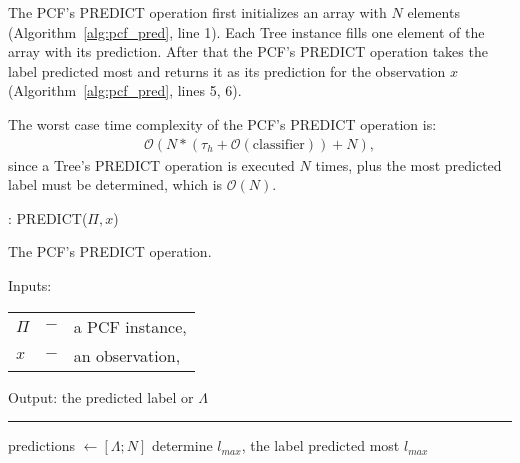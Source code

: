 The PCF's PREDICT operation first initializes an array with
$N$ elements (Algorithm~\ref{alg:pcf_pred}, line 1). Each
Tree instance fills one element of the array with its
prediction. After that the PCF's PREDICT operation takes
the label predicted most and returns it as its prediction
for the observation $x$ (Algorithm~\ref{alg:pcf_pred},
lines 5, 6).

The worst case time complexity of the PCF's PREDICT
operation is:
\begin{align}
  \mathcal{O}(N * (\tau_h + \mathcal{O} (\text{classifier})) + N),
\end{align}
since a Tree's PREDICT operation
is executed $N$ times, plus the most predicted label
must be determined, which is $\mathcal{O}(N)$.

\begin{algorithm}
  \caption{: PREDICT($\Pi, x$)}
  \label{alg:pcf_pred}
  The PCF's PREDICT operation.

  Inputs:

    \begin{tabu}{llX}
    $\Pi$ &$-$ &a PCF instance,\\
    $x$ &$-$ &an observation, \\
    \end{tabu}

  Output: the predicted label or $\Lambda$

  \noindent\rule{\linewidth}{0.4pt}

  \begin{algorithmic}[1]
    \STATE predictions $\leftarrow [\Lambda; N]$
    \ENDFOR
    \STATE determine $l_{max}$, the label predicted most
    \RETURN $l_{max}$
  \end{algorithmic}
\end{algorithm}
